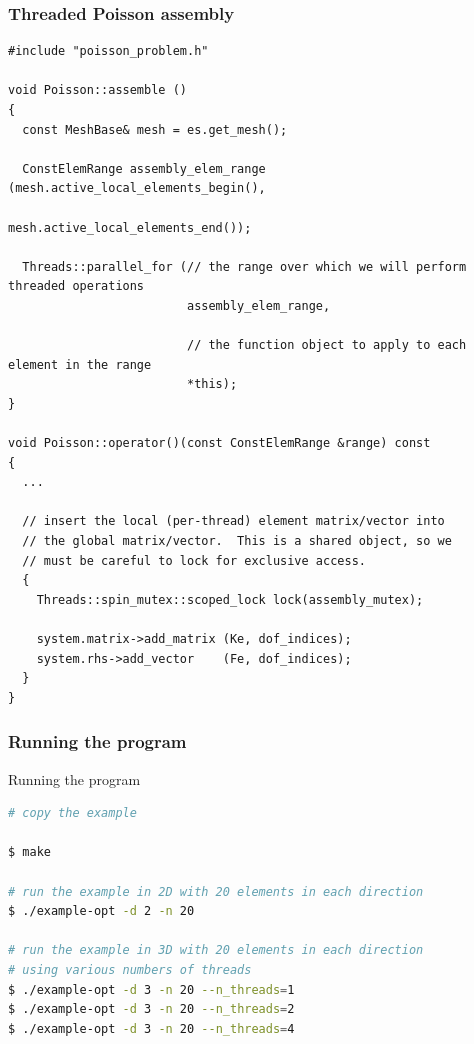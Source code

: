 \begin{frame}
  \frametitle{Threaded Poisson assembly}

  \begin{lstlisting}
#include "poisson_problem.h"

void Poisson::assemble ()
{
  const MeshBase& mesh = es.get_mesh();

  ConstElemRange assembly_elem_range (mesh.active_local_elements_begin(),
                                      mesh.active_local_elements_end());

  Threads::parallel_for (// the range over which we will perform threaded operations
                         assembly_elem_range,

                         // the function object to apply to each element in the range
                         *this);
}

void Poisson::operator()(const ConstElemRange &range) const
{
  ...

  // insert the local (per-thread) element matrix/vector into
  // the global matrix/vector.  This is a shared object, so we
  // must be careful to lock for exclusive access.
  {
    Threads::spin_mutex::scoped_lock lock(assembly_mutex);
    
    system.matrix->add_matrix (Ke, dof_indices);
    system.rhs->add_vector    (Fe, dof_indices);
  }
}
  \end{lstlisting}
\end{frame}
\begin{frame}[fragile]
  \frametitle{Running the program}
    \begin{block}{Running the program}
    \begin{lstlisting}[language=bash]
# copy the example

$ make

# run the example in 2D with 20 elements in each direction
$ ./example-opt -d 2 -n 20 

# run the example in 3D with 20 elements in each direction
# using various numbers of threads
$ ./example-opt -d 3 -n 20 --n_threads=1
$ ./example-opt -d 3 -n 20 --n_threads=2
$ ./example-opt -d 3 -n 20 --n_threads=4

    \end{lstlisting}
  \end{block}
\end{frame}
